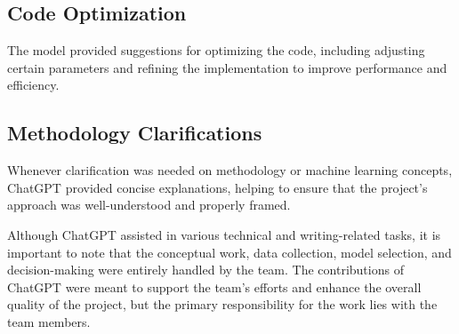 \documentclass[journal]{IEEEtran}
\begin{document}
\subsection{Code Optimization} The model provided suggestions for optimizing the code, including adjusting certain parameters and refining the implementation to improve performance and efficiency.


\subsection{Methodology Clarifications} Whenever clarification was needed on methodology or machine learning concepts, ChatGPT provided concise explanations, helping to ensure that the project’s approach was well-understood and properly framed.

Although ChatGPT assisted in various technical and writing-related tasks, it is important to note that the conceptual work, data collection, model selection, and decision-making were entirely handled by the team. The contributions of ChatGPT were meant to support the team’s efforts and enhance the overall quality of the project, but the primary responsibility for the work lies with the team members. 
\end{document}
